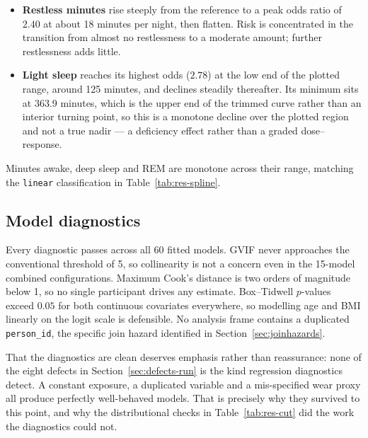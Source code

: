 \documentclass[11pt]{article}
\newcommand{\code}[1]{\texttt{\small #1}}
\begin{document}
\begin{itemize}[leftmargin=1.4em,itemsep=1pt]
\item \textbf{Restless minutes} rise steeply from the reference to a peak odds ratio of $2.40$ at
about 18 minutes per night, then flatten. Risk is concentrated in the transition from almost no
restlessness to a moderate amount; further restlessness adds little.
\item \textbf{Light sleep} reaches its highest odds ($2.78$) at the low end of the plotted range,
around 125 minutes, and declines steadily thereafter. Its minimum sits at 363.9 minutes, which is
the upper end of the trimmed curve rather than an interior turning point, so this is a monotone
decline over the plotted region and not a true nadir --- a deficiency effect rather than a graded
dose--response.
\end{itemize}

\noindent Minutes awake, deep sleep and REM are monotone across their range, matching the
\code{linear} classification in Table~\ref{tab:res-spline}.



\subsection{Model diagnostics}
\label{sec:res-diag}
Every diagnostic passes across all 60 fitted models. GVIF never approaches the conventional
threshold of 5, so collinearity is not a concern even in the 15-model combined configurations.
Maximum Cook's distance is two orders of magnitude below 1, so no single participant drives any
estimate. Box--Tidwell $p$-values exceed $0.05$ for both continuous covariates everywhere, so
modelling age and BMI linearly on the logit scale is defensible. No analysis frame contains a
duplicated \code{person_id}, the specific join hazard identified in Section~\ref{sec:joinhazards}.

That the diagnostics are clean deserves emphasis rather than reassurance: none of the eight defects
in Section~\ref{sec:defects-run} is the kind regression diagnostics detect. A constant exposure, a
duplicated variable and a mis-specified wear proxy all produce perfectly well-behaved models. That
is precisely why they survived to this point, and why the distributional checks in
Table~\ref{tab:res-cut} did the work the diagnostics could not.
\end{document}
